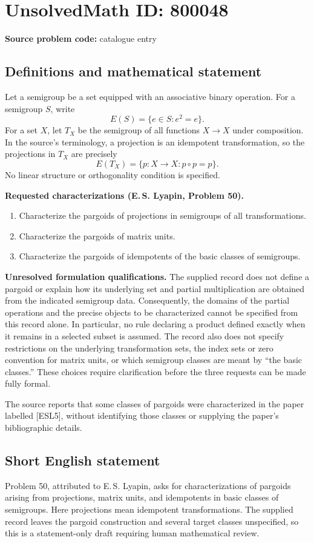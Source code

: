 \documentclass[11pt]{article}
\begin{document}
\section*{UnsolvedMath ID: 800048}
\textbf{Source problem code:} catalogue entry
\subsection{Definitions and mathematical statement}
Let a semigroup be a set equipped with an associative binary operation. For a semigroup \(S\), write
\[
E(S)=\{e\in S:e^2=e\}.
\]
For a set \(X\), let \(T_X\) be the semigroup of all functions \(X\to X\) under composition. In the source's terminology, a projection is an idempotent transformation, so the projections in \(T_X\) are precisely
\[
E(T_X)=\{p:X\to X:p\circ p=p\}.
\]
No linear structure or orthogonality condition is specified.

\textbf{Requested characterizations (E.\,S. Lyapin, Problem 50).}
\begin{enumerate}
\item Characterize the pargoids of projections in semigroups of all transformations.
\item Characterize the pargoids of matrix units.
\item Characterize the pargoids of idempotents of the basic classes of semigroups.
\end{enumerate}

\textbf{Unresolved formulation qualifications.} The supplied record does not define a pargoid or explain how its underlying set and partial multiplication are obtained from the indicated semigroup data. Consequently, the domains of the partial operations and the precise objects to be characterized cannot be specified from this record alone. In particular, no rule declaring a product defined exactly when it remains in a selected subset is assumed. The record also does not specify restrictions on the underlying transformation sets, the index sets or zero convention for matrix units, or which semigroup classes are meant by ``the basic classes.'' These choices require clarification before the three requests can be made fully formal.

The source reports that some classes of pargoids were characterized in the paper labelled [ESL5], without identifying those classes or supplying the paper's bibliographic details.
\subsection{Short English statement}
Problem 50, attributed to E.\,S. Lyapin, asks for characterizations of pargoids arising from projections, matrix units, and idempotents in basic classes of semigroups. Here projections mean idempotent transformations. The supplied record leaves the pargoid construction and several target classes unspecified, so this is a statement-only draft requiring human mathematical review.
\end{document}
